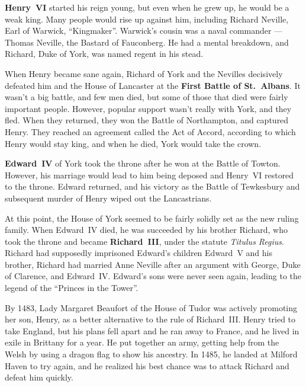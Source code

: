 \textbf{Henry~VI} started his reign young, but even when he grew up, he would be a weak king.
Many people would rise up against him, including Richard Neville, Earl of Warwick, ``Kingmaker''.
Warwick's cousin was a naval commander --- Thomas Neville, the Bastard of Fauconberg.
He had a mental breakdown, and Richard, Duke of York, was named regent in his stead.

When Henry became sane again, Richard of York and the Nevilles decisively defeated
him and the House of Lancaster at the \textbf{First Battle of St.\ Albans}.
It wasn't a big battle, and few men died, but some of those that died were fairly important people.
However, popular support wasn't really with York, and they fled.
When they returned, they won the Battle of Northampton, and captured Henry.
They reached an agreement called the Act of Accord, according to which Henry would stay king,
and when he died, York would take the crown.

\textbf{Edward~IV} of York took the throne after he won at the Battle of Towton.
However, his marriage would lead to him being deposed and Henry~VI restored to the throne.
Edward returned, and his victory as the Battle of Tewkesbury
and subsequent murder of Henry wiped out the Lancastrians.

At this point, the House of York seemed to be fairly solidly set as the new ruling family.
When Edward~IV died, he was succeeded by his brother Richard,
who took the throne and became \textbf{Richard~III}, under the statute \textit{Titulus Regius}.
Richard had supposedly imprisoned Edward's children Edward~V and his brother,
Richard had married Anne Neville after an argument with George, Duke of Clarence, and Edward~IV\@.
Edward's sons were never seen again,
leading to the legend of the ``Princes in the Tower''.

By 1483, Lady Margaret Beaufort of the House of Tudor was actively promoting her son, Henry,
as a better alternative to the rule of Richard~III\@.
Henry tried to take England, but his plans fell apart and he ran away to France,
and he lived in exile in Brittany for a year.
He put together an army, getting help from the Welsh by using a dragon flag to show his ancestry.
In 1485, he landed at Milford Haven to try again,
and he realized his best chance was to attack Richard and defeat him quickly.

